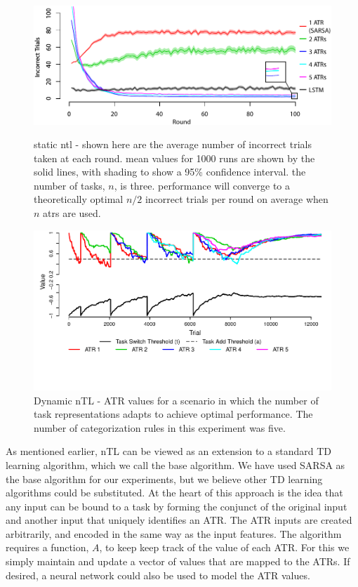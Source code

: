 \documentclass[10pt,letterpaper]{article}
\begin{document}
\begin{figure}[t!]
    \centering
    \begin{minipage}{0.48\textwidth}
        \centering
        \includegraphics[scale=.53]{images/task_performance.pdf}
        \caption[]{static ntl - shown here are the average number of incorrect trials taken at each round. mean values for 1000 runs are shown by the solid lines, with shading to show a 95\% confidence interval. the number of tasks, $n$, is three. performance will converge to a theoretically optimal $ n/2 $ incorrect trials per round on average when $ n $ atrs are used.}
        \label{fig:task_performance}
    \end{minipage}\hfill
    \begin{minipage}{0.48\textwidth}
        \centering
          \includegraphics[scale=.53]{images/learn_num_tasks.pdf}
          \caption[]{Dynamic nTL - ATR values for a scenario in which the number of task representations adapts to achieve optimal performance. The number of categorization rules in this experiment was five.}
          \label{fig:learn_num_tasks}
    \end{minipage}\hfill
\end{figure}
        
As mentioned earlier, nTL can be viewed as an extension to a standard TD learning algorithm, which we call the base algorithm. We have used SARSA as the base algorithm for our experiments, but we believe other TD learning algorithms could be substituted. At the heart of this approach is the idea that any input can be bound to a task by forming the conjunct of the original input and another input that uniquely identifies an ATR. The ATR inputs are created arbitrarily, and encoded in the same way as the input features. The algorithm requires a function, $A$, to keep keep track of the value of each ATR. For this we simply maintain and update a vector of values that are mapped to the ATRs. If desired, a neural network could also be used to model the ATR values.
   
\end{document}
